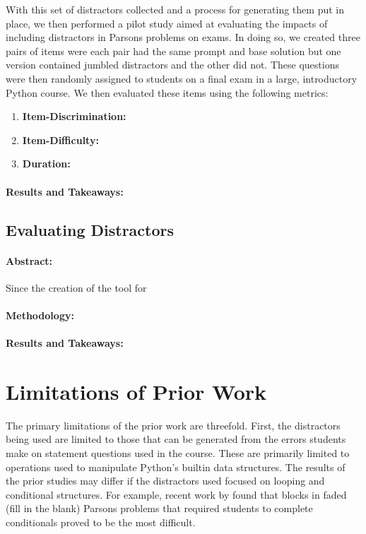 \documentclass[authorversion,nonacm]{acmart}
\begin{document}
With this set of distractors collected and a process for generating them put in
place, we then performed a pilot study aimed at evaluating the impacts of including
distractors in Parsons problems on exams. In doing so, we created three pairs of items
were each pair had the same prompt and base solution but one version contained jumbled
distractors and the other did not. These questions were then randomly assigned to
students on a final exam in a large, introductory Python course.  We then
evaluated these items using the following metrics: 
\begin{enumerate}
  \item \textbf{Item-Discrimination:}
  \item \textbf{Item-Difficulty:}
  \item \textbf{Duration:}
\end{enumerate}

\paragraph{Results and Takeaways:}


\subsection{Evaluating Distractors}\label{sec:eval}

\paragraph{Abstract:} Since the creation of the tool for 

\paragraph{Methodology:}

\paragraph{Results and Takeaways:}

\section{Limitations of Prior Work}

The primary limitations of the prior work are threefold. First, the distractors 
being used are limited to those that can be generated from the errors students
make on statement questions used in the course. These are primarily limited to 
operations used to manipulate Python's builtin data structures. The results of 
the prior studies may differ if the distractors used focused on looping and 
conditional structures. For example, recent work by \citet{} found that 
blocks in faded (fill in the blank) Parsons problems that required students
to complete conditionals proved to be the most difficult.
\end{document}
